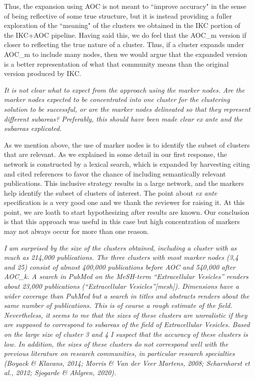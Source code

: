 \documentclass[11pt, oneside]{article}   	%
\begin{document}
Thus, the expansion using AOC is not meant to ``improve accuracy" in the sense of being reflective of some true structure, but it is instead providing a fuller exploration of the ``meaning" of the clusters we obtained in the IKC portion of the IKC+AOC pipeline.  Having said this, we do feel that the AOC\_{m} version if closer to reflecting the true nature of a cluster. Thus, if a cluster expands under AOC\_{m}  to include many nodes, then we would argue that the expanded version  is a better representation of what that community means than the original version produced by IKC. 


 
\vspace{2 mm}  
\emph{It is not clear what to expect from the approach using the marker nodes. Are the marker nodes expected to be concentrated into one cluster for the clustering solution to be successful, or are the marker nodes delineated so that they represent different subareas? Preferably, this should have been made clear ex ante and the subareas explicated.}

\vspace{2 mm}  
As we mention above, the use of marker nodes is to identify the subset of clusters that are relevant. As we explained in some detail in our first response, the network is constructed by a lexical search, which is expanded by harvesting citing and cited references to favor the chance of including semantically relevant publications. This inclusive strategy results in a large network, and the markers help identify the subset of clusters of interest. The point about \emph{ex ante} specification is a very good one and we thank the reviewer for raising it. At this point, we are loath to start hypothesizing after results are known. Our conclusion is that this approach was useful in this case but high concentration of markers may not always occur for more than one reason.

\vspace{2 mm}  
\emph{ I am surprised by the size of the clusters obtained, including a cluster with as much as 214,000 publications. The three clusters with most marker nodes (3,4 and 25) consist of almost 400,000 publications before AOC and 540,000 after AOC\_k. A search in PubMed on the MeSH-term “Extracellular Vesicles” renders about 23,000 publications (“Extracellular Vesicles”[mesh]). Dimensions have a wider coverage than PubMed but a search in titles and abstracts renders about the same number of publications. This is of course a rough estimate of the field. Nevertheless, it seems to me that the sizes of these clusters are unrealistic if they are supposed to correspond to subareas of the field of Extracellular Vesicles. Based on the large size of cluster 3 and 4 I suspect that the accuracy of these clusters is low. In addition, the sizes of these clusters do not correspond well with the previous literature on research communities, in particular research specialties (Boyack \& Klavans, 2014; Morris \& Van der Veer Martens, 2008; Scharnhorst et al., 2012; Sjogarde \& Ahlgren, 2020).}
\end{document}
